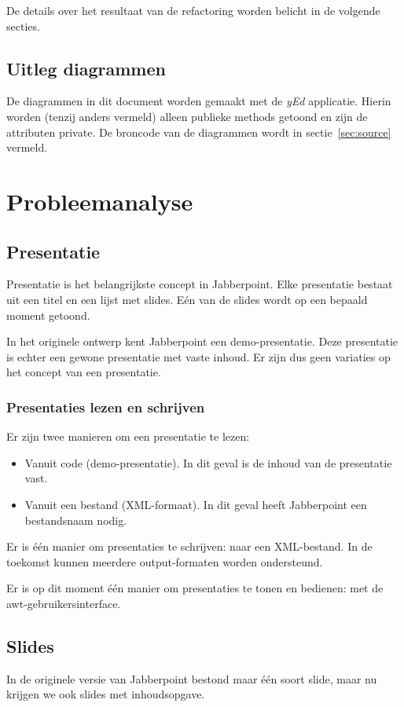 \documentclass[a4paper]{article}
\begin{document}
	De details over het resultaat van de refactoring worden belicht in de volgende secties.

	\subsection*{Uitleg diagrammen}
		De diagrammen in dit document worden gemaakt met de \textit{yEd} applicatie.
		Hierin worden (tenzij anders vermeld) alleen publieke methods getoond en zijn de attributen private.
		De broncode van de diagrammen wordt in sectie~\ref{sec:source} vermeld.
	
\section{Probleemanalyse}
    \label{sec:probleemanalyse}

	\subsection{Presentatie}\label{sec:presentatie-analyse}
		Presentatie is het belangrijkste concept in Jabberpoint.
		Elke presentatie bestaat uit een titel en een lijst met slides.
		Eén van de slides wordt op een bepaald moment getoond.

		In het originele ontwerp kent Jabberpoint een demo-presentatie.
		Deze presentatie is echter een gewone presentatie met vaste inhoud.
		Er zijn dus geen variaties op het concept van een presentatie.

		\subsubsection{Presentaties lezen en schrijven}
			Er zijn twee manieren om een presentatie te lezen:
			\begin{itemize}
				\item Vanuit code (demo-presentatie).
					In dit geval is de inhoud van de presentatie vast.
				\item Vanuit een bestand (XML-formaat).
					In dit geval heeft Jabberpoint een bestandsnaam nodig.
			\end{itemize}

			Er is één manier om presentaties te schrijven: naar een XML-bestand.
			In de toekomst kunnen meerdere output-formaten worden ondersteund.

			Er is op dit moment één manier om presentaties te tonen en bedienen: met de awt-gebruikersinterface.

	\subsection{Slides}\label{sec:slides-analyse}
		In de originele versie van Jabberpoint bestond maar één soort slide, maar nu krijgen we ook slides met inhoudsopgave.
\end{document}
